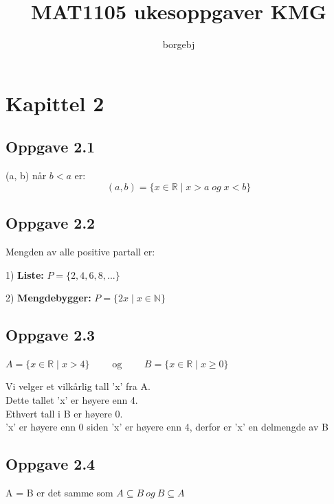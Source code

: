 \documentclass{article}
\title{MAT1105 ukesoppgaver KMG}
\author{borgebj}
\date{}
\begin{document}
\maketitle

\section*{Kapittel 2}

\subsection*{Oppgave 2.1}

(a, b) når $b < a$ er: 
\[ (a, b) = \{ x \in \mathbb{R} \mid x > a\; og \; x < b\} \]

\subsection*{Oppgave 2.2}

Mengden av alle positive partall er: 

1) \textbf{Liste:} \hspace{6em} 
\(P = \{2, 4, 6, 8, ...\}\) 

2) \textbf{Mengdebygger:} \hspace{1em}
\( P = \{ 2x \mid x \in \mathbb{N}\} \) \\

\subsection*{Oppgave 2.3}

\(A = \{x \in \mathbb{R} \mid x > 4\} \hspace{2em} \text{ og } \hspace{2em} B = \{x \in \mathbb{R} \mid x \ge 0\}\)

Vi velger et vilkårlig tall 'x' fra A.\\
Dette tallet 'x' er høyere enn 4.\\
Ethvert tall i B er høyere 0.\\
'x' er høyere enn 0 siden 'x' er høyere enn 4, derfor er 'x' en delmengde av B\\

\newpage

\subsection*{Oppgave 2.4}

A = B er det samme som \(A \subseteq B \ og \ B \subseteq A\)
\end{document}
